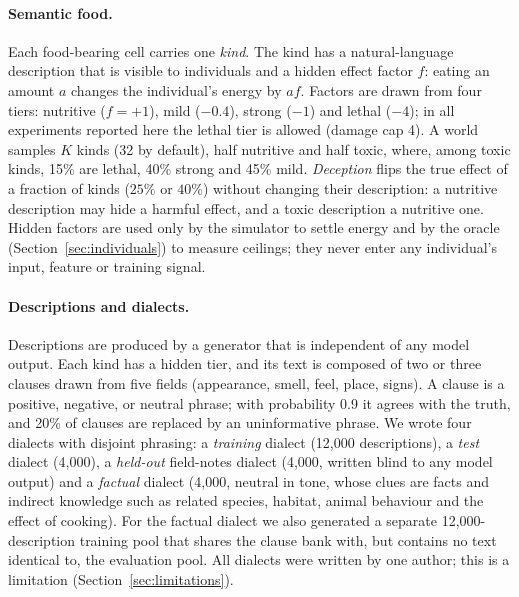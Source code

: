 \paragraph{Semantic food.}
Each food-bearing cell carries one \emph{kind}. The kind has a natural-language description that is visible to individuals and a hidden effect factor $f$: eating an amount $a$ changes the individual's energy by $af$. Factors are drawn from four tiers: nutritive ($f=+1$), mild ($-0.4$), strong ($-1$) and lethal ($-4$); in all experiments reported here the lethal tier is allowed (damage cap 4). A world samples $K$ kinds (32 by default), half nutritive and half toxic, where, among toxic kinds, 15\% are lethal, 40\% strong and 45\% mild. \emph{Deception} flips the true effect of a fraction of kinds ($25\%$ or $40\%$) without changing their description: a nutritive description may hide a harmful effect, and a toxic description a nutritive one. Hidden factors are used only by the simulator to settle energy and by the oracle (Section~\ref{sec:individuals}) to measure ceilings; they never enter any individual's input, feature or training signal.

\paragraph{Descriptions and dialects.}
Descriptions are produced by a generator that is independent of any model output. Each kind has a hidden tier, and its text is composed of two or three clauses drawn from five fields (appearance, smell, feel, place, signs). A clause is a positive, negative, or neutral phrase; with probability 0.9 it agrees with the truth, and 20\% of clauses are replaced by an uninformative phrase. We wrote four dialects with disjoint phrasing: a \emph{training} dialect (12,000 descriptions), a \emph{test} dialect (4,000), a \emph{held-out} field-notes dialect (4,000, written blind to any model output) and a \emph{factual} dialect (4,000, neutral in tone, whose clues are facts and indirect knowledge such as related species, habitat, animal behaviour and the effect of cooking). For the factual dialect we also generated a separate 12,000-description training pool that shares the clause bank with, but contains no text identical to, the evaluation pool. All dialects were written by one author; this is a limitation (Section~\ref{sec:limitations}).

